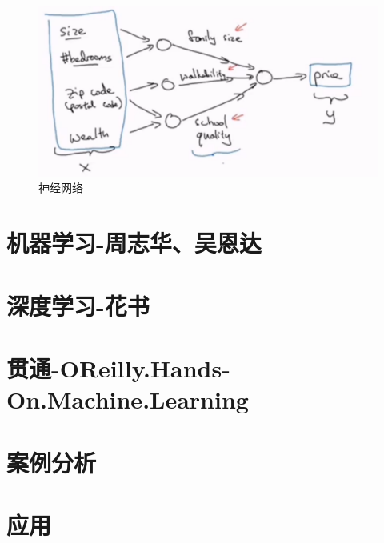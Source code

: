\documentclass[UTF8,a4paper,12pt]{ctexbook}
\begin{document}
	
		\begin{figure}[H]
			\centering
			\includegraphics[width=\linewidth]{Neuron2}
			\caption{神经网络}
		\end{figure}
	
	

\chapter{机器学习-周志华、吴恩达}


\chapter{深度学习-花书}

\chapter{贯通-OReilly.Hands-On.Machine.Learning}


\chapter{案例分析}


\chapter{应用}



  
		    
\end{document}
